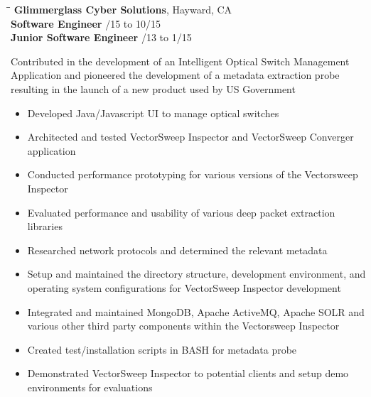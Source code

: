 \documentclass{res}
\begin{document}
\begin{resume}
   
   
   
   \begin{tabbing}
   \hspace{2.3in}\= \hspace{2.6in}\= \kill %
    {\bf Glimmerglass Cyber Solutions}, Hayward, CA \\
	    {\bf Software Engineer} \> /15 to 10/15 \\
	    {\bf Junior Software Engineer} \> /13 to 1/15 \\
   \end{tabbing}\vspace{-32pt}      %
	 Contributed in the development of an Intelligent Optical Switch Management Application and 
     pioneered the development of a metadata extraction probe resulting in the launch of a new product used by US Government
					 \vspace{2pt}
	 \begin{itemize}\addtolength{\itemsep}{-0.5\baselineskip}
		\item Developed Java/Javascript UI to manage optical switches
		\item Architected and tested VectorSweep Inspector and VectorSweep Converger application
		\item Conducted performance prototyping for various versions of the Vectorsweep Inspector
		\item Evaluated performance and usability of various deep packet extraction libraries
		\item Researched network protocols and determined the relevant metadata
		\item Setup and maintained the directory structure, development environment, and operating system configurations for VectorSweep Inspector development
		\item Integrated and maintained MongoDB, Apache ActiveMQ, Apache SOLR and various other third party components within the Vectorsweep Inspector
		\item Created test/installation scripts in BASH for metadata probe
		\item Demonstrated VectorSweep Inspector to potential clients and setup demo environments for evaluations
		
   \end{itemize}




\end{resume}
\end{document}
